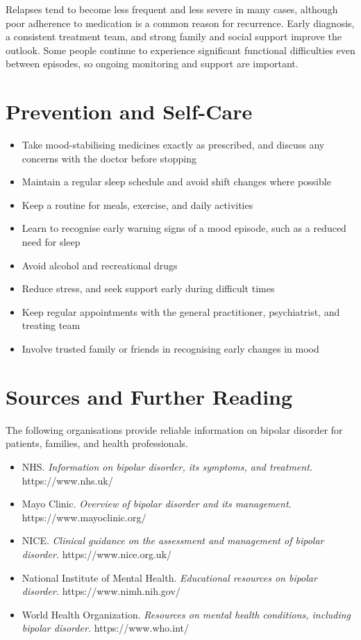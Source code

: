 Relapses tend to become less frequent and less severe in many cases, although poor adherence to medication is a common reason for recurrence. Early diagnosis, a consistent treatment team, and strong family and social support improve the outlook. Some people continue to experience significant functional difficulties even between episodes, so ongoing monitoring and support are important.

\section*{Prevention and Self-Care}
\begin{itemize}
    \item Take mood-stabilising medicines exactly as prescribed, and discuss any concerns with the doctor before stopping
    \item Maintain a regular sleep schedule and avoid shift changes where possible
    \item Keep a routine for meals, exercise, and daily activities
    \item Learn to recognise early warning signs of a mood episode, such as a reduced need for sleep
    \item Avoid alcohol and recreational drugs
    \item Reduce stress, and seek support early during difficult times
    \item Keep regular appointments with the general practitioner, psychiatrist, and treating team
    \item Involve trusted family or friends in recognising early changes in mood
\end{itemize}

\section*{Sources and Further Reading}
The following organisations provide reliable information on bipolar disorder for patients, families, and health professionals.

\begin{itemize}
    \item NHS. \textit{Information on bipolar disorder, its symptoms, and treatment.} https://www.nhs.uk/
    \item Mayo Clinic. \textit{Overview of bipolar disorder and its management.} https://www.mayoclinic.org/
    \item NICE. \textit{Clinical guidance on the assessment and management of bipolar disorder.} https://www.nice.org.uk/
    \item National Institute of Mental Health. \textit{Educational resources on bipolar disorder.} https://www.nimh.nih.gov/
    \item World Health Organization. \textit{Resources on mental health conditions, including bipolar disorder.} https://www.who.int/
\end{itemize}
